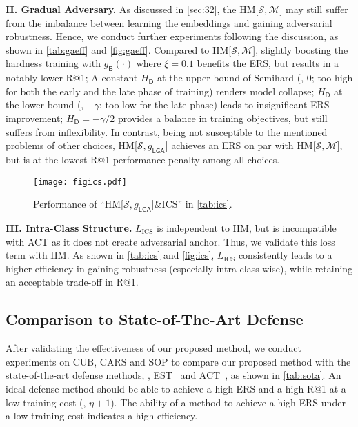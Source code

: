 \documentclass[10pt,twocolumn,letterpaper]{article}
\begin{document}
\noindent\textbf{II. Gradual Adversary.}
%
As discussed in \cref{sec:32}, the HM[$\mathcal{S},\mathcal{M}$] may still
suffer from the imbalance between learning the embeddings and gaining
adversarial robustness.
%
Hence, we conduct further experiments %
following the discussion, as shown in \cref{tab:gaeff} and \cref{fig:gaeff}.
%
Compared to HM[$\mathcal{S},\mathcal{M}$], slightly boosting the hardness
training with $g_\mathsf{B}(\cdot)$ where $\xi{=}0.1$ benefits the ERS, but
results in a notably lower R@1;
%
A constant $H_\mathsf{D}$ at the upper bound of Semihard (\ie, $0$; too high
for both the early and the late phase of training) renders model collapse;
%
$H_\mathsf{D}$ at the lower bound (\ie, $-\gamma$; too low for the late phase)
leads to insignificant ERS improvement;
%
$H_\mathsf{D}{=}-\gamma/2$ provides a balance in training objectives, but
still suffers from inflexibility.
%
In contrast, being not susceptible to the mentioned problems of other choices,
HM[$\mathcal{S},g_\mathsf{LGA}$] achieves an ERS on par with
HM[$\mathcal{S},\mathcal{M}$], but is at the lowest R@1 performance penalty among all choices.

\begin{figure}[t]
	\vspace{-1em}
	\texttt{[image: figics.pdf]}
	\vspace{-1.9em}
	\caption{Performance of ``HM[$\mathcal{S},g_\mathsf{LGA}$]\&ICS'' in \cref{tab:ics}.}
\end{figure}


\noindent\textbf{III. Intra-Class Structure.}
%
$L_\text{ICS}$ is independent to HM, but is incompatible with ACT as it
does not create adversarial anchor.
%
Thus, we validate this loss term with HM.
%
As shown in \cref{tab:ics} and \cref{fig:ics}, $L_\text{ICS}$ consistently
leads to a higher efficiency in gaining robustness (especially
intra-class-wise), while retaining an acceptable trade-off in R@1.



\subsection{Comparison to State-of-The-Art Defense}
\label{sec:43}

After validating the effectiveness of our proposed method, we conduct
experiments on CUB, CARS and SOP to compare our proposed method
with the state-of-the-art defense methods, \ie, EST~\cite{advrank}
and ACT~\cite{robrank}, as shown in \cref{tab:sota}.
%
An ideal defense method should be able to achieve a high ERS and a high R@1
at a low training cost (\ie, $\eta+1$).
%
The ability of a method to achieve a high ERS under a low training cost
indicates a high efficiency.
\end{document}
